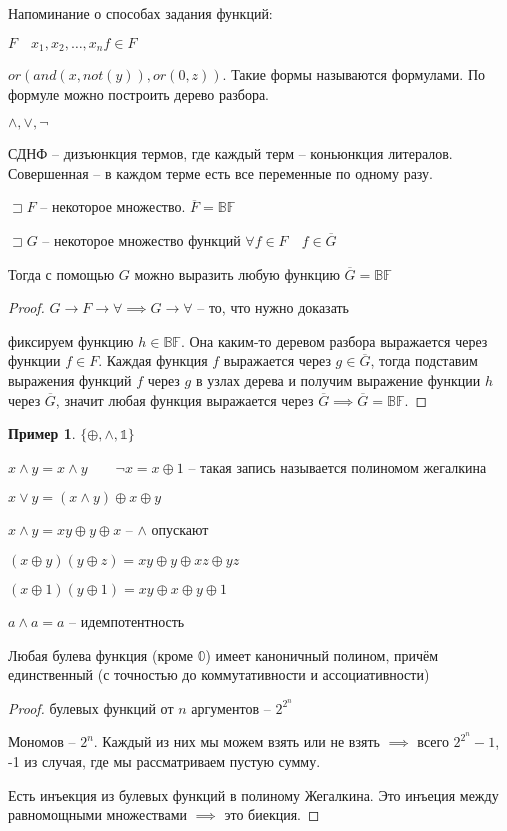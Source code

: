 \documentclass{book}
\theoremstyle{definition}
\newtheorem*{example}{Пример}
\begin{document}
    Напоминание о способах задания функций:

    $F\quad x_1, x_2, \ldots ,x_{n} f\in F$

    $or(and(x, not(y)),or(0,z))$. Такие формы называются формулами. По формуле можно построить дерево разбора.

    $\land, \lor, \neg$ 

    СДНФ -- дизъюнкция термов, где каждый терм -- коньюнкция литералов. Совершенная --  в каждом терме есть все переменные по одному разу.

    \begin{lemma}
        $\sqsupset F$ -- некоторое множество. $\overline{F} = \mathbb{BF}$

        $\sqsupset G$ -- некоторое множество функций $\forall f\in F\quad f\in \overline{G}$

        Тогда с помощью $G$ можно выразить любую функцию $\overline{G} = \mathbb{BF}$
    \end{lemma}
    \begin{proof}
        $G\to F\to \forall  \implies G\to \forall $ -- то, что нужно доказать

        фиксируем функцию $h\in \mathbb{BF}$. Она каким-то деревом разбора выражается через функции $f\in F$. Каждая функция $f$ выражается через $g\in \overline{G}$, тогда подставим выражения функций $f$ через $g$  в узлах дерева и получим выражение функции $h$ через $\overline{G}$, значит любая функция выражается через $\overline{G} \implies \overline{G} = \mathbb{BF}$. 
    \end{proof}

    \begin{example}
        $\{\oplus, \land, \mathbb{1}\}$

        $x\land y = x\land y\qquad \neg x = x\oplus 1$ -- такая запись называется полиномом жегалкина

        $x\lor y = (x\land y)\oplus x\oplus y$
    \end{example}

    $x\land y = xy\oplus y\oplus x$ -- $\land$ опускают

    $(x\oplus y)(y\oplus z) = xy\oplus y\oplus xz\oplus yz$

    $(x\oplus 1)(y\oplus 1) = xy\oplus x\oplus y\oplus 1$

    $a\land a = a$ -- идемпотентность 

    \begin{theorem}
        Любая булева функция (кроме $\mathbb{0}$) имеет каноничный полином, причём единственный (с точностью до коммутативности и ассоциативности)
    \end{theorem}
    \begin{proof}
        булевых функций от $n$ аргументов -- $2^{2^n}$

        Мономов -- $2^n$. Каждый из них мы можем взять или не взять $\implies $ всего $2^{2^n}-1$, -1 из случая, где мы рассматриваем пустую сумму.

        Есть инъекция из булевых функций в полиному Жегалкина. Это инъеция между равномощными множествами $\implies $ это биекция.
    \end{proof}
\end{document}
